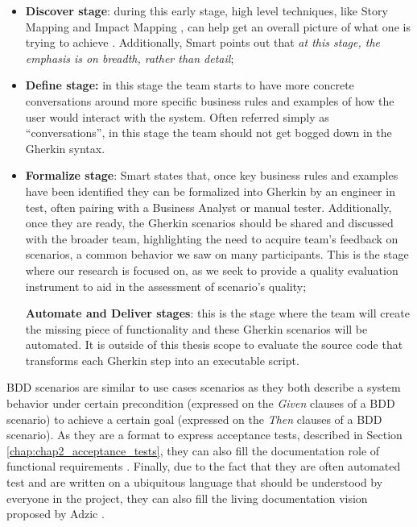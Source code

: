 \begin{itemize}
    \item \textbf{Discover stage}: during this early stage, high level techniques, like Story Mapping \cite{Paton_User_Story_Mapping_2014} and Impact Mapping \cite{Gojko_Impact_Mapping_2012}, can help get an overall picture of what one is trying to achieve \cite{Ferguson_2017}. Additionally, Smart \cite{Ferguson_2017} points out that \textit{at this stage, the emphasis is on breadth, rather than detail};
    
    \item \textbf{Define stage:} in this stage the team starts to have more concrete conversations around more specific business rules and examples of how the user would interact with the system. Often referred simply as ``conversations'', in this stage the team should not get bogged down in the Gherkin syntax.
    
    \item \textbf{Formalize stage}: Smart \cite{Ferguson_2017} states that, once key business rules and examples have been identified they can be formalized into Gherkin by an engineer in test, often pairing with a Business Analyst or manual tester. Additionally, once they are ready, the Gherkin scenarios should be shared and discussed with the broader team, highlighting the need to acquire team's feedback on scenarios, a common behavior we saw on many participants. This is the stage where our research is focused on, as we seek to provide a quality evaluation instrument to aid in the assessment of scenario's quality;
    
    \textbf{Automate and Deliver stages}: this is the stage where the team will create the missing piece of functionality and these Gherkin scenarios will be automated. It is outside of this thesis scope to evaluate the source code that transforms each Gherkin step into an executable script.

\end{itemize}

BDD scenarios are similar to use cases scenarios as they both describe a system behavior under certain precondition (expressed on the \textit{Given} clauses of a BDD scenario) to achieve a certain goal (expressed on the \textit{Then} clauses of a BDD scenario). As they are a format to express acceptance tests, described in Section \ref{chap:chap2_acceptance_tests}, they can also fill the documentation role of functional requirements \cite{Babok_2009}\cite{Babok_2015}. Finally, due to the fact that they are often automated test and are written on a ubiquitous language that should be understood by everyone in the project, they can also fill the living documentation vision proposed by Adzic \cite{Adzic_2011}.


